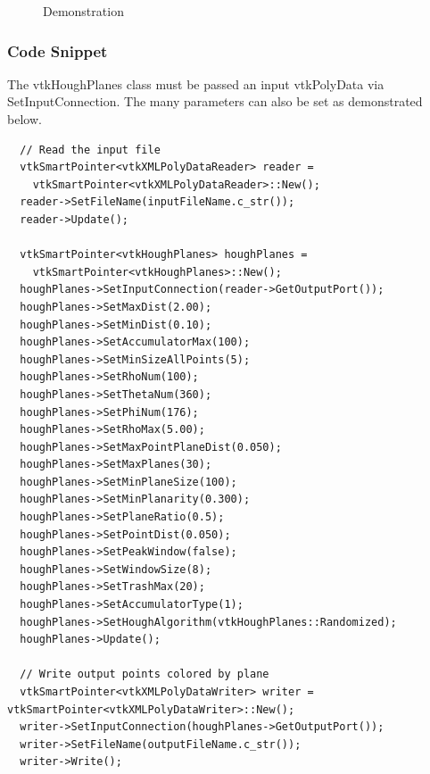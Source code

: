 \documentclass{InsightArticle}
\begin{document}
\begin{figure}[H]
\centering
{}
\caption{Demonstration}
\label{fig:Demonstration}
\end{figure}

\subsubsection{Code Snippet}
The vtkHoughPlanes class must be passed an input vtkPolyData via SetInputConnection. The many parameters can also be set as demonstrated below.
\begin{verbatim}
  // Read the input file
  vtkSmartPointer<vtkXMLPolyDataReader> reader =
    vtkSmartPointer<vtkXMLPolyDataReader>::New();
  reader->SetFileName(inputFileName.c_str());
  reader->Update();
  
  vtkSmartPointer<vtkHoughPlanes> houghPlanes =
    vtkSmartPointer<vtkHoughPlanes>::New();
  houghPlanes->SetInputConnection(reader->GetOutputPort());
  houghPlanes->SetMaxDist(2.00);
  houghPlanes->SetMinDist(0.10);
  houghPlanes->SetAccumulatorMax(100);
  houghPlanes->SetMinSizeAllPoints(5);
  houghPlanes->SetRhoNum(100);
  houghPlanes->SetThetaNum(360);
  houghPlanes->SetPhiNum(176);
  houghPlanes->SetRhoMax(5.00);
  houghPlanes->SetMaxPointPlaneDist(0.050);
  houghPlanes->SetMaxPlanes(30);
  houghPlanes->SetMinPlaneSize(100);
  houghPlanes->SetMinPlanarity(0.300);
  houghPlanes->SetPlaneRatio(0.5);
  houghPlanes->SetPointDist(0.050);
  houghPlanes->SetPeakWindow(false);
  houghPlanes->SetWindowSize(8);
  houghPlanes->SetTrashMax(20);
  houghPlanes->SetAccumulatorType(1);
  houghPlanes->SetHoughAlgorithm(vtkHoughPlanes::Randomized);
  houghPlanes->Update();

  // Write output points colored by plane
  vtkSmartPointer<vtkXMLPolyDataWriter> writer = vtkSmartPointer<vtkXMLPolyDataWriter>::New();
  writer->SetInputConnection(houghPlanes->GetOutputPort());
  writer->SetFileName(outputFileName.c_str());
  writer->Write();

\end{verbatim}

% 
% 
\end{document}
